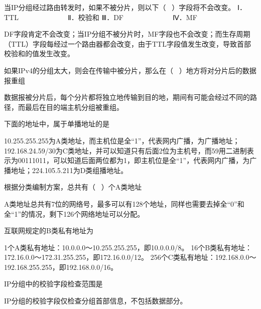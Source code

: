 \question 当IP分组经过路由转发时，如果不被分片，则以下（ ~）字段将不会改变。
Ⅰ．TTL ~ ~ ~ ~ ~ ~ ~ ~ Ⅱ．校验和 Ⅲ．DF ~ ~ ~ ~ ~ ~ ~ ~ Ⅳ．MF
\par{}
\begin{solution}DF字段肯定不会改变；当IP分组不被分片时，MF字段也不会改变；而生存周期（TTL）字段每经过一个路由器都会改变，由于TTL字段值发生改变，导致首部校验和的值发生改变。
\end{solution}
\question 如果IPv4的分组太大，则会在传输中被分片，那么在（
~）地方将对分片后的数据报重组
\par{}
\begin{solution}数据报被分片后，每个分片都将独立地传输到目的地，期间有可能会经过不同的路径，而最后在目的端主机分组被重组。
\end{solution}
\question 下面的地址中，属于单播地址的是
\par{}
\begin{solution}10.255.255.255为A类地址，而主机位是全``1''，代表网内广播，为广播地址；192.168.24.59/30为C类地址，并可以知道只有后面2位为主机号，而59用二进制表示为00111011，可以知道后面两位都为1，即主机位是全``1''，代表网内广播，为广播地址；224.105.5.211为D类组播地址。
\end{solution}
\question 根据分类编制方案，总共有（ ~）个A类地址
\par{}
\begin{solution}A类地址总共有7位的网络号，最多可以有128个地址，同样也需要去掉全``0''和全``1''的情况，剩下126个网络地址可以分配。
\end{solution}
\question 互联网规定的B类私有地址为
\par{}
\begin{solution}1个A类私有地址：10.0.0.0～10.255.255.255，即10.0.0.0/8。
16个B类私有地址：172.16.0.0～172.31.255.255，即172.16.0.0/12。
256个C类私有地址：192.168.0.0～192.168.255.255，即192.168.0.0/16。
\end{solution}
\question IP分组中的校验字段检查范围是
\par{}
\begin{solution}IP分组的校验字段仅检查分组首部信息，不包括数据部分。
\end{solution}
